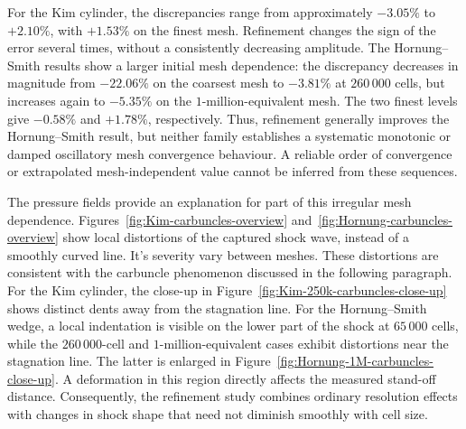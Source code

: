For the Kim cylinder, the discrepancies range from approximately \(-3.05\%\)
to \(+2.10\%\), with \(+1.53\%\) on the finest mesh. Refinement changes the
sign of the error several times, without a consistently decreasing
amplitude. The Hornung--Smith results show a larger initial mesh dependence:
the discrepancy decreases in magnitude from \(-22.06\%\) on the coarsest mesh
to \(-3.81\%\) at \(260\,000\) cells, but increases again to \(-5.35\%\)
on the \(1\)-million-equivalent mesh. The two finest levels give \(-0.58\%\)
and \(+1.78\%\), respectively. Thus, refinement generally improves the
Hornung--Smith result, but neither family establishes a systematic monotonic
or damped oscillatory mesh convergence behaviour. A reliable order of convergence or extrapolated mesh-independent value cannot be inferred from these sequences.
\par\medskip

The pressure fields provide an explanation for part of this irregular mesh
dependence. Figures~\ref{fig:Kim-carbuncles-overview}
and~\ref{fig:Hornung-carbuncles-overview} show local distortions of the captured
shock wave, instead of a smoothly curved line. It's severity vary between meshes. These distortions are consistent with the carbuncle phenomenon discussed in the following paragraph. For the Kim cylinder, the close-up in Figure~\ref{fig:Kim-250k-carbuncles-close-up} shows distinct dents away from the stagnation line. For the Hornung--Smith wedge, a local indentation is
visible on the lower part of the shock at \(65\,000\) cells, while the
\(260\,000\)-cell and \(1\)-million-equivalent cases exhibit distortions
near the stagnation line. The latter is enlarged in
Figure~\ref{fig:Hornung-1M-carbuncles-close-up}. A deformation in this region
directly affects the measured stand-off distance. Consequently, the refinement
study combines ordinary resolution effects with changes in shock shape that
need not diminish smoothly with cell size.

